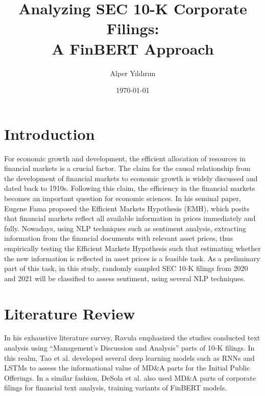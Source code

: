 \documentclass{article}
\title{Analyzing SEC 10-K Corporate Filings:\\ A FinBERT Approach}
\author{Alper Yıldırım}
\date{\today}
\begin{document}
\maketitle

\section{Introduction}

For economic growth and development, the efficient allocation of resources in financial markets is a crucial factor. The claim for the causal relationship from the development of financial markets to economic growth is widely discussed and dated back to 1910s. \cite{schumpeter1911} \cite{king1993finance} \cite{levine1997financial} Following this claim, the efficiency in the financial markets becomes an important question for economic sciences. In his seminal paper, Eugene Fama proposed the Efficient Markets Hypothesis (EMH), which posits that financial markets reflect all available information in prices immediately and fully. \cite{fama1970efficient} Nowadays, using NLP techniques such as sentiment analysis, extracting information from the financial documents with relevant asset prices, thus empirically testing the Efficient Markets Hypothesis such that estimating whether the new information is reflected in asset prices is a feasible task. As a preliminary part of this task, in this study, randomly sampled SEC 10-K filings from 2020 and 2021 will be classified to assess sentiment, using several NLP techniques.
\\ 

\section{Literature Review}

In his exhaustive literature survey, Ravula emphasized the studies conducted text analysis using ``Management's Discussion and Analysis'' parts of 10-K filings. \cite{ravula2021text} In this realm, Tao et al. developed several deep learning models such as RNNs and LSTMs to assess the informational value of MD\&A parts for the Initial Public Offerings. \cite{tao2018analysing} In a similar fashion, DeSola et al. also used MD\&A parts of corporate filings for financial text analysis, training variants of FinBERT models. \cite{desola2019finbert} \\
\end{document}
